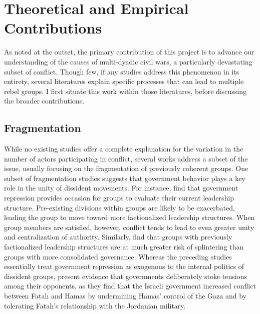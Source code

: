 \section{Theoretical and Empirical Contributions}

As noted at the outset, the primary contribution of this project is to advance our understanding of the causes of multi-dyadic civil wars, a particularly devastating subset of conflict. Though few, if any studies address this phenomenon in its entirety, several literatures explain specific processes that can lead to multiple rebel groups. I first situate this work within those literatures, before discussing the broader contributions.

\subsection{Fragmentation}

While no existing studies offer a complete explanation for the variation in the number of actors participating in conflict, several works address a subset of the issue, usually focusing on the fragmentation of previously coherent groups. One subset of fragmentation studies suggests that government behavior plays a key role in the unity of dissident movements. For instance, \citet{McLauchlin2012} find that government repression provides occasion for groups to evaluate their current leadership structure. Pre-existing divisions within groups are likely to be exacerbated, leading the group to move toward more factionalized leadership structures. When group members are satisfied, however, conflict tends to lead to even greater unity and centralization of authority. Similarly, \citet{Asal2012} find that groups with previously factionalized leadership structures are at much greater risk of splintering than groups with more consolidated governance. Whereas the preceding studies essentially treat government repression as exogenous to the internal politics of dissident groups, \citet{Bhavnani2011} present evidence that governments deliberately stoke tensions among their opponents, as they find that the Israeli government increased conflict between Fatah and Hamas by undermining Hamas' control of the Gaza and by tolerating Fatah's relationship with the Jordanian military.

